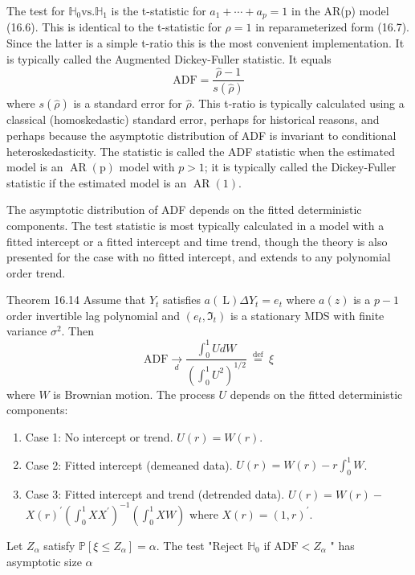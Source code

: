 \documentclass[10pt]{article}
\begin{document}
The test for $\mathbb{H}_{0} \mathrm{vs} . \mathbb{H}_{1}$ is the t-statistic for $a_{1}+\cdots+a_{p}=1$ in the AR(p) model (16.6). This is identical to the t-statistic for $\rho=1$ in reparameterized form (16.7). Since the latter is a simple t-ratio this is the most convenient implementation. It is typically called the Augmented Dickey-Fuller statistic. It equals
$$
\mathrm{ADF}=\frac{\widehat{\rho}-1}{s(\widehat{\rho})}
$$
where $s(\widehat{\rho})$ is a standard error for $\widehat{\rho}$. This t-ratio is typically calculated using a classical (homoskedastic) standard error, perhaps for historical reasons, and perhaps because the asymptotic distribution of ADF is invariant to conditional heteroskedasticity. The statistic is called the ADF statistic when the estimated model is an $\operatorname{AR}(\mathrm{p})$ model with $p>1$; it is typically called the Dickey-Fuller statistic if the estimated model is an $\operatorname{AR}(1)$.

The asymptotic distribution of ADF depends on the fitted deterministic components. The test statistic is most typically calculated in a model with a fitted intercept or a fitted intercept and time trend, though the theory is also presented for the case with no fitted intercept, and extends to any polynomial order trend.

Theorem 16.14 Assume that $Y_{t}$ satisfies $a(\mathrm{~L}) \Delta Y_{t}=e_{t}$ where $a(z)$ is a $p-1$ order invertible lag polynomial and $\left(e_{t}, \Im_{t}\right)$ is a stationary MDS with finite variance $\sigma^{2}$. Then
$$
\mathrm{ADF} \underset{d}{\longrightarrow} \frac{\int_{0}^{1} U d W}{\left(\int_{0}^{1} U^{2}\right)^{1 / 2}} \stackrel{\text { def }}{=} \xi
$$
where $W$ is Brownian motion. The process $U$ depends on the fitted deterministic components:

\begin{enumerate}
  \item Case 1: No intercept or trend. $U(r)=W(r)$.

  \item Case 2: Fitted intercept (demeaned data). $U(r)=W(r)-r \int_{0}^{1} W$.

  \item Case 3: Fitted intercept and trend (detrended data). $U(r)=W(r)-$ $X(r)^{\prime}\left(\int_{0}^{1} X X^{\prime}\right)^{-1}\left(\int_{0}^{1} X W\right)$ where $X(r)=(1, r)^{\prime}$.

\end{enumerate}
Let $Z_{\alpha}$ satisfy $\mathbb{P}\left[\xi \leq Z_{\alpha}\right]=\alpha$. The test "Reject $\mathbb{H}_{0}$ if $\mathrm{ADF}<Z_{\alpha}$ " has asymptotic size $\alpha$
\end{document}
